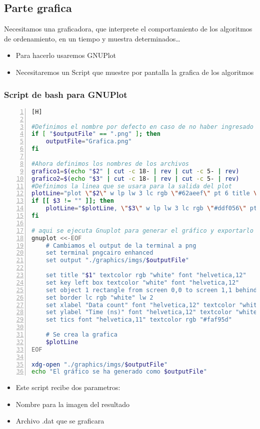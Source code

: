 \subsection{Parte grafica}
Necesitamos una graficadora, que interprete el comportamiento de los algoritmos de ordenamiento, en un tiempo y muestra determinados\dots
\begin{itemize}
  \item Para hacerlo usaremos GNUPlot
  \item Necesitaremos un Script que muestre por pantalla la grafica de los algoritmos
\end{itemize}
\subsubsection{Script de bash para GNUPlot}

\begin{lstlisting}[language=bash, caption={Script de GNUPlot}, numbers=left, firstnumber=1][H]

#Definimos el nombre por defecto en caso de no haber ingresado un nombre en el segundo parametro
if [ "$outputFile" == ".png" ]; then
	outputFile="Grafica.png"
fi

#Ahora definimos los nombres de los archivos
grafico1=$(echo "$2" | cut -c 18- | rev | cut -c 5- | rev)
grafico2=$(echo "$3" | cut -c 18- | rev | cut -c 5- | rev)
#Definimos la linea que se usara para la salida del plot
plotLine="plot \"$2\" w lp lw 3 lc rgb \"#62aeef\" pt 6 title \"$grafico1\""
if [[ $3 != "" ]]; then
	plotLine="$plotLine, \"$3\" w lp lw 3 lc rgb \"#ddf056\" pt 6 t \"$grafico2\""
fi

# aqui se ejecuta Gnuplot para generar el gráfico y exportarlo
gnuplot <<-EOF
	# Cambiamos el output de la terminal a png
	set terminal pngcairo enhanced
	set output "./graphics/imgs/$outputFile"

	set title "$1" textcolor rgb "white" font "helvetica,12"
	set key left box textcolor "white" font "helvetica,12"
	set object 1 rectangle from screen 0,0 to screen 1,1 behind noclip fc rgb "#32363d" fillstyle solid 1.0
	set border lc rgb "white" lw 2
	set xlabel "Data count" font "helvetica,12" textcolor "white"
	set ylabel "Time (ns)" font "helvetica,12" textcolor "white"
	set tics font "helvetica,11" textcolor rgb "#faf95d"

	# Se crea la grafica
	$plotLine
EOF

xdg-open "./graphics/imgs/$outputFile"
echo "El gráfico se ha generado como $outputFile"  

\end{lstlisting}
\begin{itemize}
  \item Este script recibe dos parametros:
  \item Nombre para la imagen del resultado
  \item Archivo .dat que se graficara 

\end{itemize}
